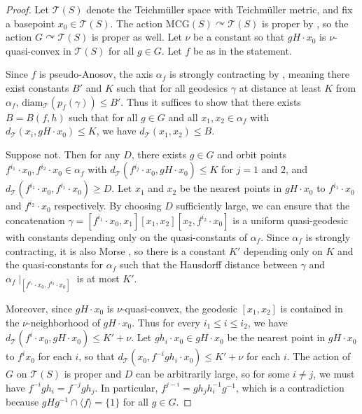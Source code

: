 \documentclass[11pt,letterpaper]{amsart}
\theoremstyle{definition}
\theoremstyle{plain}
\theoremstyle{TheoremNum}
\begin{document}
\begin{proof}
    Let $\mathcal{T}(S)$ denote the Teichm\"{u}ller space with Teichm\"{u}ller metric, and fix a basepoint $x_0 \in \mathcal{T}(S)$. The action $\text{MCG}(S) \curvearrowright \mathcal{T}(S)$ is proper by \cite{MCG-primer}, so the action $G \curvearrowright \mathcal{T}(S)$ is proper as well. Let $\nu$ be a constant so that $gH \cdot x_0$ is $\nu$-quasi-convex in $\mathcal{T}(S)$ for all $g \in G$. Let $f$ be as in the statement. 
    
    Since $f$ is pseudo-Anosov, the axis $\alpha_f$ is strongly contracting by \cite{Minsky-Teich-projections}, meaning there exist constants $B'$ and $K$ such that for all geodesics $\gamma$ at distance at least $K$ from $\alpha_f$, $\text{diam}_{\mathcal{T}}(p_f(\gamma)) \leq B'$. Thus it suffices to show that there exists $B = B(f,h)$ such that for all $g \in G$ and all $x_1 , x_2 \in \alpha_f$ with $d_{\mathcal{T}}(x_i , gH\cdot x_0) \leq K$, we have $d_{\mathcal{T}}(x_1 , x_2) \leq B$. 
    
    Suppose not. Then for any $D$, there exists $g \in G$ and orbit points $f^{i_1} \cdot x_0 , f^{i_2} \cdot x_0 \in \alpha_f$ with $d_{\mathcal{T}}(f^{i_j} \cdot x_0 , gH \cdot x_0) \leq K$ for $j = 1$ and $2$, and $d_{\mathcal{T}}(f^{i_1} \cdot x_0 , f^{i_1} \cdot x_0) \geq D$. Let $x_1$ and $x_2$ be the nearest points in $gH \cdot x_0$ to $f^{i_1} \cdot x_0$ and $f^{i_2} \cdot x_0$ respectively. By choosing $D$ sufficiently large, we can ensure that the concatenation $\gamma = [f^{i_1} \cdot x_0, x_1][x_1 , x_2] [x_2, f^{i_2}\cdot x_0]$ is a uniform quasi-geodesic with constants depending only on the quasi-constants of $\alpha_f$. Since $\alpha_f$ is strongly contracting, it is also Morse \cite{Arzhantseva-Cashen-Gruber-Hume-contraction}, so there is a constant $K'$ depending only on $K$ and the quasi-constants for $\alpha_f$ such that the Hausdorff distance between $\gamma$ and $\alpha_f \mid_{[f^{i_1} \cdot x_0 , f^{i_2} \cdot x_0]}$ is at most $K'$.

    Moreover, since $gH\cdot x_0$ is $\nu$-quasi-convex, the geodesic $[x_1 , x_2]$ is contained in the $\nu$-neighborhood of $gH \cdot x_0$. Thus for every $i_1 \leq i \leq i_2$, we have $d_{\mathcal{T}}(f^{i} \cdot x_0 , gH \cdot x_0) \leq K' + \nu$. Let $gh_i \cdot x_0 \in g H \cdot x_0$ be the nearest point in $gH \cdot x_0$ to $f^{i}x_0$ for each $i$, so that $d_{\mathcal{T}}(x_0 , f^{-i}gh_i \cdot x_0) \leq K' + \nu$ for each $i$. The action of $G$ on $\mathcal{T}(S)$ is proper and $D$ can be arbitrarily large, so for some $i \neq j$, we must have $f^{-i}gh_i = f^{-j}gh_j$. In particular, $f^{j-i} = g h_j h_i^{-1} g^{-1}$, which is a contradiction because $g H g^{-1} \cap \langle f \rangle = \{1\}$ for all $g \in G$.
\end{proof}
\end{document}
